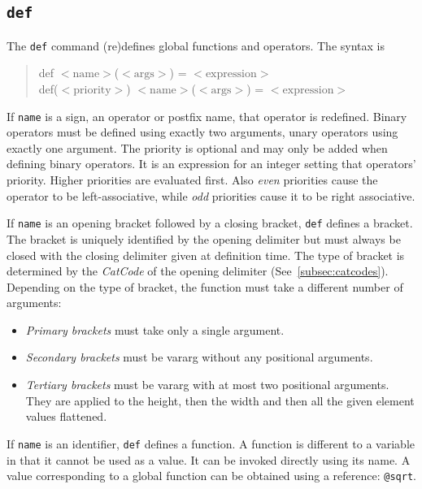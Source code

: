 \documentclass[10pt]{article}
\newcommand{\argument}[1]{{${\big<}\mathrm{#1}{\big>}$}}
\newenvironment{code}{\begin{quote}\ttfamily}{\end{quote}}
\begin{document}
    \subsection{\texttt{def}}\label{subsec:cmd-def}
    The \verb|def| command {\small(re)}defines global functions and operators.
    The syntax is
    \begin{code}
        def \argument{name}(\argument{args}) = \argument{expression} \\
        def(\argument{priority}) \argument{name}(\argument{args}) = \argument{expression}
    \end{code}
    If \verb|name| is a sign, an operator or postfix name, that operator is redefined.
    Binary operators must be defined using exactly two arguments, unary operators using exactly one argument.
    The priority is optional and may only be added when defining binary operators.
    It is an expression for an integer setting that operators' priority.
    Higher priorities are evaluated first.
    Also \textsl{even} priorities cause the operator to be left-associative, while \textsl{odd} priorities cause it to be right associative.
    
    If \verb|name| is an opening bracket followed by a closing bracket, \verb|def| defines a bracket.
    The bracket is uniquely identified by the opening delimiter but must always be closed with the closing delimiter given at definition time.
    The type of bracket is determined by the \textsl{CatCode} of the opening delimiter (See~\ref{subsec:catcodes}).
    Depending on the type of bracket, the function must take a different number of arguments:
    \begin{itemize}
        \item \textsl{Primary brackets} must take only a single argument.
        \item \textsl{Secondary brackets} must be vararg without any positional arguments.
        \item \textsl{Tertiary brackets} must be vararg with at most two positional arguments.
              They are applied to the height, then the width and then all the given element values flattened.
    \end{itemize}
    
    If \verb|name| is an identifier, \verb|def| defines a function.
    A function is different to a variable in that it cannot be used as a value.
    It can be invoked directly using its name.
    A value corresponding to a global function can be obtained using a reference: \verb|@sqrt|.
    
\end{document}
